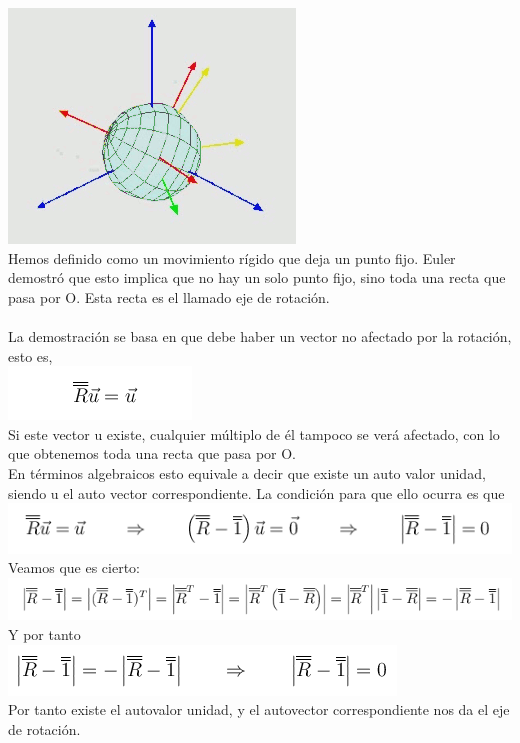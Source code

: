 \documentclass[12pt,a4paper]{article}
\begin{document}
\includegraphics[scale=1]{xyz.PNG} \\
Hemos definido como un movimiento rígido que deja un punto fijo. Euler demostró que esto implica que no hay un solo punto fijo, sino toda una recta que pasa por O. Esta recta es el llamado eje de rotación.\\\\
La demostración se basa en que debe haber un vector no afectado por la rotación, esto es,\\
\includegraphics[scale=1]{Ru.PNG} \\
Si este vector u existe, cualquier múltiplo de él tampoco se verá afectado, con lo que obtenemos toda una recta que pasa por O.\\
En términos algebraicos esto equivale a decir que existe un auto valor unidad, siendo u el auto vector correspondiente. La condición para que ello ocurra es que\\
\includegraphics[scale=1]{Ru2.PNG} \\
Veamos que es cierto:\\
\includegraphics[scale=1]{Ru3.PNG} \\
Y por tanto\\
\includegraphics[scale=1]{Ru4.PNG} \\
Por tanto existe el autovalor unidad, y el autovector correspondiente nos da el eje de rotación.
\end{document}
